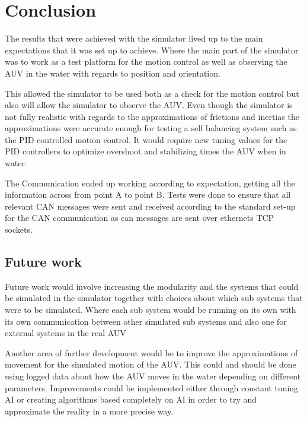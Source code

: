 \section{Conclusion}\label{sec:conclusion}
The results that were achieved with the simulator lived up to the main expectations that it was set up to achieve. Where the main part of the simulator was to work as a test platform for the motion control as well as observing the AUV in the water with regards to position and orientation.

This allowed the simulator to be used both as a check for the motion control but also will allow the simulator to observe the AUV. Even though the simulator is not fully realistic with regards to the approximations of frictions and inertias the approximations were accurate enough for testing a self balancing system such as the PID controlled motion control. It would require new tuning values for the PID controllers to optimize overshoot and stabilizing times the AUV when in water.

The Communication ended up working according to expectation, getting all the information across from point A to point B. Tests were done to ensure that all relevant CAN messages were sent and received according to the standard set-up for the CAN communication as can messages are sent over ethernets TCP sockets.

\subsection{Future work}
Future work would involve increasing the modularity and the systems that could be simulated in the simulator together with choices about which sub systems that were to be simulated. Where each sub system would be running on its own with its own communication between other simulated sub systems and also one for external systems in the real AUV

Another area of further development would be to improve the approximations of movement for the simulated motion of the AUV. This could and should be done using logged data about how the AUV moves in the water depending on different parameters. Improvements could be implemented either through constant tuning AI or creating algorithms based completely on AI in order to try and approximate the reality in a more precise way. 
